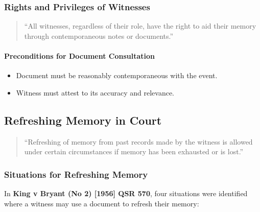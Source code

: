 \subsubsection{Rights and Privileges of
Witnesses}\label{rights-and-privileges-of-witnesses}

\begin{quote}
``All witnesses, regardless of their role, have the right to aid their
memory through contemporaneous notes or documents.''
\end{quote}

\paragraph{Preconditions for Document
Consultation}\label{preconditions-for-document-consultation}

\begin{itemize}
\tightlist
\item
  Document must be reasonably contemporaneous with the event.
\item
  Witness must attest to its accuracy and relevance.
\end{itemize}

\subsection{  Refreshing Memory in
Court}\label{refreshing-memory-in-court}

\begin{quote}
``Refreshing of memory from past records made by the witness is allowed
under certain circumstances if memory has been exhausted or is lost.''
\end{quote}

\subsubsection{Situations for Refreshing
Memory}\label{situations-for-refreshing-memory}

In \textbf{King v Bryant (No 2) {[}1956{]} QSR 570}, four situations
were identified where a witness may use a document to refresh their
memory:

